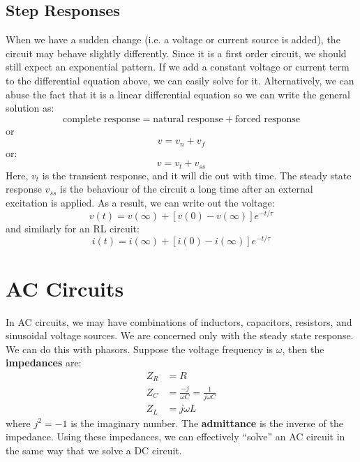 \documentclass{article}
\begin{document}
\subsection{Step Responses}
When we have a sudden change (i.e. a voltage or current source is added), the circuit may behave slightly differently. Since it is a first order circuit, we should still expect an exponential pattern. If we add a constant voltage or current term to the differential equation above, we can easily solve for it. Alternatively, we can abuse the fact that it is a linear differential equation so we can write the general solution as:
\begin{equation}
    \text{complete response} = \text{natural response} + \text{forced response} 
\end{equation}
or
\begin{equation}
    v = v_n + v_f
\end{equation}
or:
\begin{equation}
    v = v_t + v_{ss}
\end{equation}
Here, $v_t$ is the transient response, and it will die out with time. The steady state response $v_{ss}$ is the behaviour of the circuit a long time after an external excitation is applied. As a result, we can write out the voltage:
\begin{equation}
    \boxed{v(t) = v(\infty) + [v(0)-v(\infty)]e^{-t/\tau}}
\end{equation}
and similarly for an RL circuit:
\begin{equation}
    \boxed{i(t) = i(\infty) + [i(0) -i(\infty)]e^{-t/\tau}}
\end{equation}
\section{AC Circuits}
In AC circuits, we may have combinations of inductors, capacitors, resistors, and sinusoidal voltage sources. We are concerned only with the steady state response. We can do this with phasors. Suppose the voltage frequency is $\omega$, then the \textbf{impedances} are:
\begin{align}
    Z_R &= R \\ 
    Z_C &= \frac{-j}{\omega C} = \frac{1}{j\omega C} \\ 
    Z_L &= j\omega L
\end{align}
where $j^2=-1$ is the imaginary number. The \textbf{admittance} is the inverse of the impedance. Using these impedances, we can effectively ``solve'' an AC circuit in the same way that we solve a DC circuit.
\end{document}
